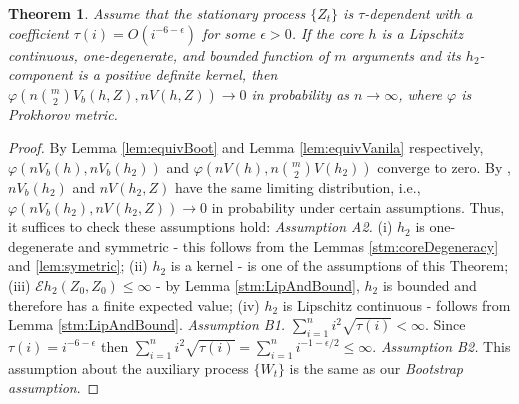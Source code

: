 \documentclass{article} %
\newtheorem{Theorem}{Theorem}
\newcommand{\ev}{\mathcal{E}}
\begin{document}
\begin{Theorem}
\label{th:mainOne}
Assume that the stationary process $\{Z_t\}$ is $\tau$-dependent with a coefficient $\tau(i) = O(i^{-6-\epsilon})$ for some $\epsilon>0$. If the core $h$ is a Lipschitz continuous, one-degenerate, and bounded function of $m$ arguments and its $h_2$-component is a positive definite kernel, then $\varphi(n \binom m 2 V_b(h,Z),n V(h,Z)) \to 0$ in probability as $n\to\infty$, where $\varphi$ is Prokhorov metric. 
\end{Theorem}

\begin{proof}
By  Lemma \ref{lem:equivBoot} and Lemma \ref{lem:equivVanila} respectively, $\varphi(n V_b(h),n V_b(h_2))$ and $\varphi(nV(h),n \binom m 2 V(h_2))$ converge to zero. By \cite[Theorem 3.1]{leucht_dependent_2013}, $n V_b(h_2)$ and $n V(h_2,Z)$ have the same limiting distribution, i.e., $\varphi(n V_b(h_2),n V(h_2,Z)) \to 0$ in probability under certain assumptions. Thus, it suffices to check these assumptions hold:
\textit{Assumption A2.}
(i) $h_2$ is one-degenerate and symmetric - this follows from the Lemmas  \ref{stm:coreDegeneracy} and \ref{lem:symetric}; 
(ii) $h_2$ is a kernel - is one of the assumptions of this Theorem;
(iii) $\ev h_2(Z_0,Z_0) \leq \infty$ - by Lemma \ref{stm:LipAndBound}, $h_2$ is bounded and therefore has a finite expected value;
(iv) $h_2$ is Lipschitz continuous - follows from Lemma \ref{stm:LipAndBound}.
\textit{Assumption B1.} $\sum_{i=1}^n i^2 \sqrt{\tau(i)} < \infty$. Since $\tau(i) = i^{-6-\epsilon}$ then $\sum_{i=1}^n i^2 \sqrt{\tau(i)} = \sum_{i=1}^n i^{-1 - \epsilon/2} \leq \infty$.
\textit{Assumption B2.} This assumption about the auxiliary process $\{W_t\}$ is the same as our \textit{Bootstrap assumption}. 
\end{proof}  
\end{document}
